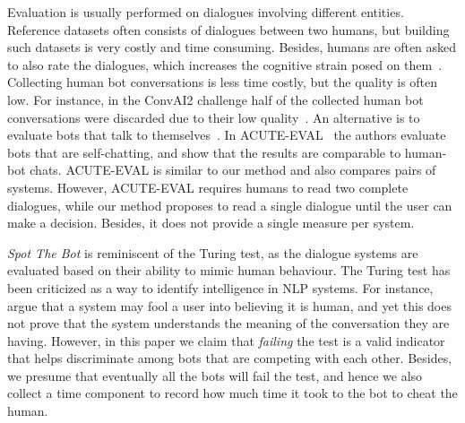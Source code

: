 \documentclass[11pt,a4paper]{article}
\begin{document}

Evaluation is usually performed on dialogues involving different entities. Reference datasets often consists of dialogues between two humans, but building such datasets is very costly and time consuming. Besides, humans are often asked to also rate the dialogues, which increases the cognitive strain posed on them~\cite{SCHMITT201512}. Collecting human bot conversations is less time costly, but the quality is often low. For instance, in the ConvAI2 challenge half of the collected human bot conversations were discarded due to their low quality~\cite{convai12}. An alternative is to evaluate bots that talk to themselves~\cite{ghandeharioun2019approximating,li2019acuteeval,deriu-cieliebak-2019-towards}. In ACUTE-EVAL~\cite{li2019acuteeval} the authors evaluate bots that are self-chatting, and show that the results are comparable to human-bot chats. ACUTE-EVAL is similar to our method and also compares pairs of systems. However, ACUTE-EVAL requires humans to read two complete dialogues, while our method proposes to read a single dialogue until the user can make a decision. Besides, it does not provide a single measure per system.

\emph{Spot The Bot} is reminiscent of the Turing test, as the dialogue systems are evaluated based on their ability to mimic human behaviour. The Turing test has been criticized as a way to identify intelligence in NLP systems. For instance, \citet{bender-2020-acl} argue that a system may fool a user into believing it is human, and yet this does not prove that the system understands the meaning of the conversation they are having. However, in this paper we claim that \emph{failing} the test is a valid indicator that helps discriminate among bots that are competing with each other. Besides, we presume that eventually all the bots will fail the test, and hence we also collect a time component to record how much time it took to the bot to cheat the human.
\end{document}
